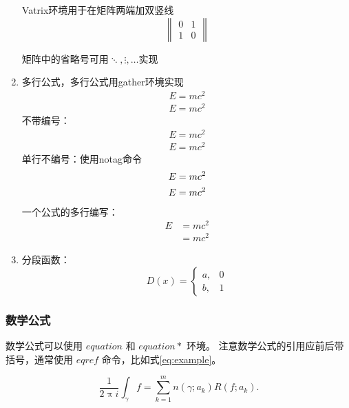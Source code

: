 \begin{enumerate}
	Vatrix环境用于在矩阵两端加双竖线
	\begin{equation*}
		\begin{Vmatrix}
			0 & 1 \\
			1 & 0
		\end{Vmatrix}
	\end{equation*}
	
	矩阵中的省略号可用$\ddots,\vdots,\dots$实现
	\iffalse
	矩阵
	&为列分隔符，\\为行分隔符
	\fi
	\item 多行公式，多行公式用gather环境实现
	\begin{gather}
		E=mc^2\\
		E=mc^2
	\end{gather}
	不带编号：
	\begin{gather*}
		E=mc^2\\
		E=mc^2
	\end{gather*}
	单行不编号：使用notag命令
	\begin{gather}
		E=mc^2 \notag \\
		E=mc^2
	\end{gather}
	一个公式的多行编写：
	\begin{equation}
		\begin{split}
			E & =mc^2  \\
			& =mc^2
		\end{split}
	\end{equation}
	\iffalse
	一个公式的多行编写:&为对齐位置
	\fi
	\item 分段函数：
	\begin{equation}
		D(x)=\begin{cases}
			a, &0 \\
			b, &1
		\end{cases}
	\end{equation} 
\end{enumerate}

\subsubsection{数学公式}

数学公式可以使用 ${equation}$ 和 ${equation*}$ 环境。
注意数学公式的引用应前后带括号，通常使用 ${eqref}$ 命令，比如式\ref{eq:example}。
\iffalse
eqref需要使用标签方式
\fi
\begin{equation}
	\frac{1}{2 \uppi i} \int_\gamma f = \sum_{k=1}^m n(\gamma; a_k) R(f; a_k).
	\label{eq:example}
\end{equation}


